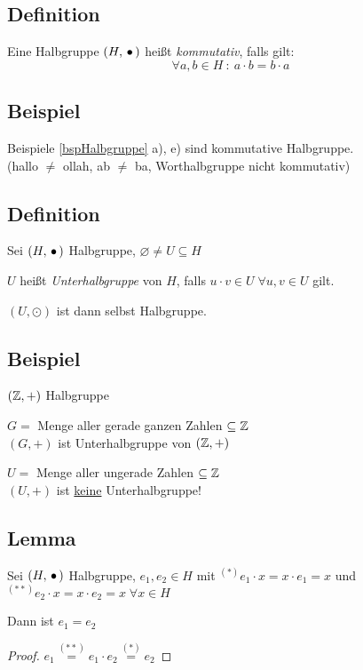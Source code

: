  
 \subsection{Definition}
 
 Eine Halbgruppe $(H, \,{\bullet}\,)$ heißt \emph{kommutativ}, falls gilt:
 \[ \tag{Kommutativgesetz, KG}
 \forall a, b \in H\::\: a \cdot b = b \cdot a \]
 
 \subsection{Beispiel}
 
 Beispiele \ref{bspHalbgruppe} a), e) sind kommutative Halbgruppe.
 \\ (hallo $\neq$ ollah, ab $\neq$ ba, Worthalbgruppe nicht kommutativ) 
 
 \subsection{Definition}
 
 Sei $(H, \,{\bullet}\,)$ Halbgruppe, $\varnothing \neq U \subseteq H$
 
 $U$ heißt \emph{Unterhalbgruppe} von $H$, falls $u \cdot v \in U \; \forall u, v \in U$ gilt.
 
 $(U, \odot)$ ist dann selbst Halbgruppe.
 
 \subsection{Beispiel}
 
 $(\mathbb{Z}, +)$ Halbgruppe
 
 $G =$ Menge aller gerade ganzen Zahlen $\subseteq \mathbb{Z}$
 \\$(G, +)$ ist Unterhalbgruppe von $(\mathbb{Z}, +)$
 
 $U =$ Menge aller ungerade Zahlen $\subseteq \mathbb{Z}$
 \\$(U, +)$ ist \underline{keine} Unterhalbgruppe!
 
 \subsection{Lemma} \label{nullelemEindeutig}
 
 Sei $(H, \,{\bullet}\,)$ Halbgruppe, $e_1, e_2 \in H$ mit 
 $^{(*)} e_1 \cdot x = x \cdot e_1 = x$ und $^{(**)} e_2 \cdot x = x \cdot e_2 = x \; \forall x \in H$

 Dann ist $e_1 = e_2$
 
 \begin{proof}
 $e_1 \stackrel{(**)}{=} e_1 \cdot e_2 \stackrel{(*)}{=} e_2$
 \end{proof} 
 
